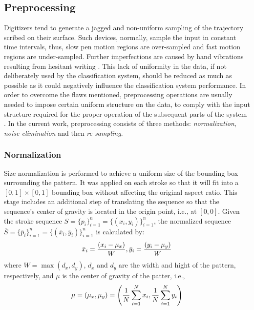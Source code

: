 \documentclass[10pt, conference, compsocconf]{IEEEtran}
\theoremstyle{definition}
\begin{document}
\subsection{Preprocessing}
Digitizers tend to generate a jagged and non-uniform sampling of the trajectory scribed on their surface.
Such devices, normally, sample the input in constant time intervals, thus, slow pen motion regions are over-sampled and fast motion regions are under-sampled.
Further imperfections are caused by hand vibrations resulting from hesitant writing \cite{huang2009preprocessing}.
This lack of uniformity in the data, if not deliberately used by the classification system, should be reduced as much as possible as it could negatively influence the classification system performance.
In order to overcome the flaws mentioned, preprocessing operations are usually needed to impose certain uniform structure on the data, to comply with the input structure required for the proper operation of the subsequent parts of the system \cite{al2011online}. In the current work, preprocessing consists of three methods: \emph{normalization}, \emph{noise elimination} and then \emph{re-sampling}.

\subsubsection{Normalization}
Size normalization is performed to achieve a uniform size of the bounding box surrounding the pattern. 
It was applied on each stroke so that it will fit into a $[0,1]\times[0,1]$ bounding box without affecting the original aspect ratio. 
This stage includes an additional step of translating the sequence so that the sequence's center of gravity is located in the origin point, i.e., at $[0,0]$.
Given the stroke sequence $S=\{p_i\}_{i=1}^{n}=\{(x_i,y_i)\}_{i=1}^{n}$, the normalized sequence $\bar{S}=\{\bar p_i \}_{i=1}^{n}=\{(\bar x_i,\bar y_i)\}_{i=1}^{n}$ is calculated by: 
\begin{equation}
{\bar x_i} = {{\left( {{x_i} - {\mu _x}} \right)} \over W},{\bar y_i} = {{\left( {{y_i} - {\mu _y}} \right)} \over W}
\end{equation}
where $W = \max (d_x,d_y)$, $d_x$ and $d_y$ are the width and hight of the pattern, respectively, and $\mu$ is the center of gravity of the patter, i.e., 
\begin{equation}
\mu  = \left( {{\mu _x},{\mu _y}} \right) = \left( {{1 \over N}\sum\limits_{i = 1}^N {{x_i}} ,{1 \over N}\sum\limits_{i = 1}^N {{y_i}} } \right)
\end{equation}
\end{document}

